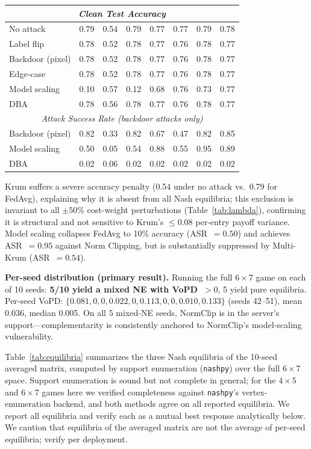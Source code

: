 \documentclass{article}
\begin{document}
\begin{table}[t]
\begin{tabular}{l|ccccccc}
\midrule
\multicolumn{8}{c}{\textit{Clean Test Accuracy}} \\
\midrule
No attack      & 0.79 & 0.54 & 0.79 & 0.77 & 0.77 & 0.79 & 0.78 \\
Label flip     & 0.78 & 0.52 & 0.78 & 0.77 & 0.76 & 0.78 & 0.77 \\
Backdoor (pixel) & 0.78 & 0.52 & 0.78 & 0.77 & 0.76 & 0.78 & 0.77 \\
Edge-case      & 0.78 & 0.52 & 0.78 & 0.77 & 0.76 & 0.78 & 0.77 \\
Model scaling  & 0.10 & 0.57 & 0.12 & 0.68 & 0.76 & 0.73 & 0.77 \\
DBA            & 0.78 & 0.56 & 0.78 & 0.77 & 0.76 & 0.78 & 0.77 \\
\midrule
\multicolumn{8}{c}{\textit{Attack Success Rate (backdoor attacks only)}} \\
\midrule
Backdoor (pixel) & 0.82 & 0.33 & 0.82 & 0.67 & 0.47 & 0.82 & 0.85 \\
Model scaling    & 0.50 & 0.05 & 0.54 & 0.88 & 0.55 & 0.95 & 0.89 \\
DBA              & 0.02 & 0.06 & 0.02 & 0.02 & 0.02 & 0.02 & 0.02 \\
\bottomrule
\end{tabular}
\end{table}

Krum suffers a severe accuracy penalty (0.54 under no attack vs.\ 0.79 for FedAvg), explaining why it is absent from all Nash equilibria; this exclusion is invariant to all $\pm50\%$ cost-weight perturbations (Table~\ref{tab:lambda}), confirming it is structural and not sensitive to Krum's ${\leq}0.08$ per-entry payoff variance. Model scaling collapses FedAvg to 10\% accuracy (ASR~$= 0.50$) and achieves ASR~$= 0.95$ against Norm Clipping, but is substantially suppressed by Multi-Krum (ASR~$= 0.54$).

\textbf{Per-seed distribution (primary result).} Running the full $6{\times}7$ game on each of 10 seeds: \textbf{5/10 yield a mixed NE with VoPD~$> 0$}, 5 yield pure equilibria. Per-seed VoPD: $\{0.081, 0, 0, 0.022, 0, 0.113, 0, 0, 0.010, 0.133\}$ (seeds 42--51), mean 0.036, median 0.005. On all 5 mixed-NE seeds, NormClip is in the server's support---complementarity is consistently anchored to NormClip's model-scaling vulnerability.

Table~\ref{tab:equilibria} summarizes the three Nash equilibria of the 10-seed averaged matrix, computed by support enumeration (\texttt{nashpy}) over the full $6 \times 7$ space. Support enumeration is sound but not complete in general; for the $4{\times}5$ and $6{\times}7$ games here we verified completeness against \texttt{nashpy}'s vertex-enumeration backend, and both methods agree on all reported equilibria. We report all equilibria and verify each as a mutual best response analytically below. We caution that equilibria of the averaged matrix are not the average of per-seed equilibria; verify per deployment.
\end{document}
